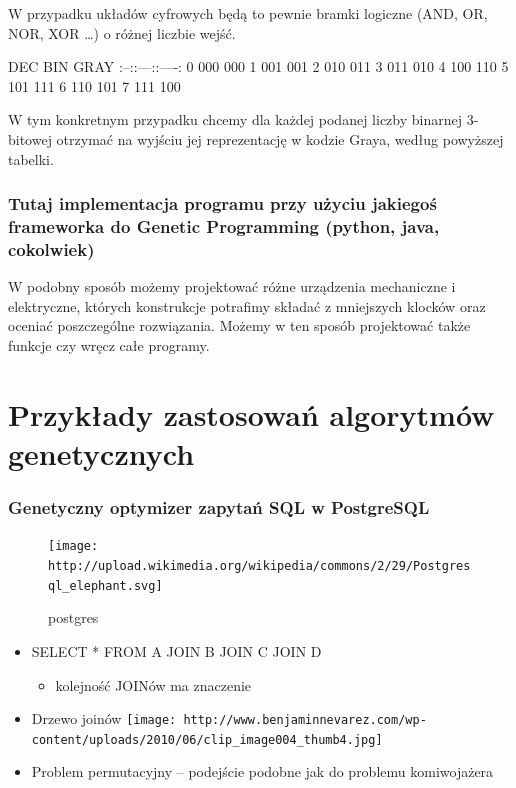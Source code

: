 \documentclass{article}
\begin{document}
W przypadku układów cyfrowych będą to pewnie bramki logiczne (AND, OR,
NOR, XOR \ldots{}) o różnej liczbie wejść.

    DEC \textbar{} BIN \textbar{} GRAY :--:\textbar{}:---:\textbar{}:----: 0
\textbar{}000 \textbar{} 000 1 \textbar{}001 \textbar{} 001 2
\textbar{}010 \textbar{} 011 3 \textbar{}011 \textbar{} 010 4
\textbar{}100 \textbar{} 110 5 \textbar{}101 \textbar{} 111 6
\textbar{}110 \textbar{} 101 7 \textbar{}111 \textbar{} 100

    W tym konkretnym przypadku chcemy dla każdej podanej liczby binarnej
3-bitowej otrzymać na wyjściu jej reprezentację w kodzie Graya, według
powyższej tabelki.

    \subsubsection{Tutaj implementacja programu przy użyciu jakiegoś
frameworka do Genetic Programming (python, java, cokolwiek)}

    W podobny sposób możemy projektować różne urządzenia mechaniczne i
elektryczne, których konstrukcje potrafimy składać z mniejszych klocków
oraz oceniać poszczególne rozwiązania. Możemy w ten sposób projektować
także funkcje czy wręcz całe programy.

    \section{Przykłady zastosowań algorytmów genetycznych}

    \subsubsection{Genetyczny optymizer zapytań SQL w PostgreSQL}

\begin{figure}[htbp]
\centering
\texttt{[image: http://upload.wikimedia.org/wikipedia/commons/2/29/Postgresql\_elephant.svg]}
\caption{postgres}
\end{figure}

    \begin{itemize}
\item
  SELECT * FROM A JOIN B JOIN C JOIN D

  \begin{itemize}
  \item
    kolejność JOINów ma znaczenie
  \end{itemize}
\item
  Drzewo joinów
  \texttt{[image: http://www.benjaminnevarez.com/wp-content/uploads/2010/06/clip\_image004\_thumb4.jpg]}
\item
  Problem permutacyjny -- podejście podobne jak do problemu komiwojażera
\end{itemize}
\end{document}
